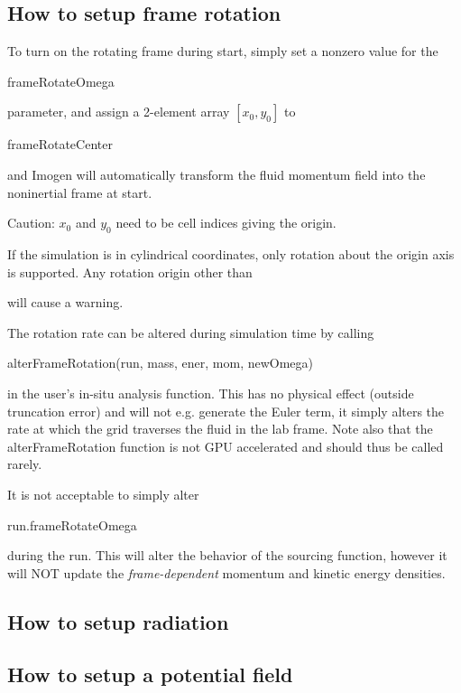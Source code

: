 \documentclass[letterpaper,12pt]{article}
\begin{document}
\subsection{How to setup frame rotation}

To turn on the rotating frame during start, simply set a nonzero value for the \begin{tt}frameRotateOmega\end{tt}
parameter, and assign a 2-element array $\left[x_0, y_0\right]$ to \begin{tt}frameRotateCenter\end{tt}
and Imogen will automatically transform the fluid momentum field into the noninertial frame at start.

Caution: $x_0$ and $y_0$ need to be cell indices giving the origin.

If the simulation is in cylindrical coordinates, only rotation about the origin axis is supported.
Any rotation origin other than \begin{tt}[0, 0]\end{tt} will cause a warning.

The rotation rate can be altered during simulation time by calling
\begin{tt}
alterFrameRotation(run, mass,\newline
ener, mom, newOmega)
\end{tt}
in the user's in-situ analysis function. This has no physical effect (outside truncation error)
and will not e.g. generate the Euler term, it simply alters the rate at which the grid traverses
the fluid in the lab frame. Note also that the alterFrameRotation function is not GPU accelerated
and should thus be called rarely.

It is not acceptable to simply alter \begin{tt}run.frameRotateOmega\end{tt} during the run.
This will alter the behavior of the sourcing function, however it will NOT update the
\textit{frame-dependent} momentum and kinetic energy densities.

\subsection{How to setup radiation}

\subsection{How to setup a potential field}
\end{document}
